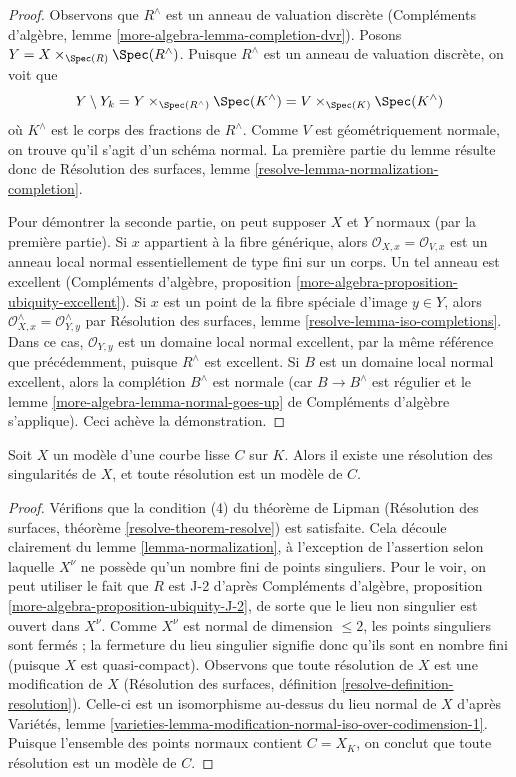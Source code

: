 \begin{proof}
Observons que $R^\wedge$ est un anneau de valuation discrète
(Compléments d'algèbre, lemme \ref{more-algebra-lemma-completion-dvr}).
Posons $Y = X \times_{\Spec(R)} \Spec(R^\wedge)$.
Puisque $R^\wedge$ est un anneau de valuation discrète, on voit que
$$
Y \setminus Y_k =
Y \times_{\Spec(R^\wedge)} \Spec(K^\wedge) =
V \times_{\Spec(K)} \Spec(K^\wedge)
$$
où $K^\wedge$ est le corps des fractions de $R^\wedge$.
Comme $V$ est géométriquement normale, on trouve qu'il s'agit
d'un schéma normal. La première partie du lemme résulte donc de
Résolution des surfaces, lemme \ref{resolve-lemma-normalization-completion}.

\medskip\noindent
Pour démontrer la seconde partie, on peut supposer $X$ et $Y$ normaux
(par la première partie). Si $x$ appartient à la fibre générique, alors
$\mathcal{O}_{X, x} = \mathcal{O}_{V, x}$ est un anneau local normal
essentiellement de type fini sur un corps. Un tel anneau est
excellent (Compléments d'algèbre, proposition
\ref{more-algebra-proposition-ubiquity-excellent}).
Si $x$ est un point de la fibre spéciale d'image $y \in Y$, alors
$\mathcal{O}_{X, x}^\wedge = \mathcal{O}_{Y, y}^\wedge$
par Résolution des surfaces, lemme \ref{resolve-lemma-iso-completions}.
Dans ce cas, $\mathcal{O}_{Y, y}$ est un domaine local normal excellent,
par la même référence que précédemment, puisque $R^\wedge$ est excellent.
Si $B$ est un domaine local normal excellent, alors la complétion
$B^\wedge$ est normale (car $B \to B^\wedge$ est régulier et le
lemme \ref{more-algebra-lemma-normal-goes-up} de Compléments d'algèbre s'applique).
Ceci achève la démonstration.
\end{proof}

\begin{lemma}
\label{lemma-regular}
Soit $X$ un modèle d'une courbe lisse $C$ sur $K$. Alors
il existe une résolution des singularités de $X$,
et toute résolution est un modèle de $C$.
\end{lemma}

\begin{proof}
Vérifions que la condition (4) du théorème de Lipman
(Résolution des surfaces, théorème \ref{resolve-theorem-resolve}) est satisfaite.
Cela découle clairement du lemme \ref{lemma-normalization},
à l'exception de l'assertion selon laquelle $X^\nu$ ne possède qu'un nombre fini de
points singuliers. Pour le voir, on peut utiliser le fait que $R$ est J-2 d'après
Compléments d'algèbre, proposition \ref{more-algebra-proposition-ubiquity-J-2},
de sorte que le lieu non singulier est ouvert dans $X^\nu$.
Comme $X^\nu$ est normal de dimension $\leq 2$, les points singuliers
sont fermés ; la fermeture du lieu singulier
signifie donc qu'ils sont en nombre fini (puisque $X$ est quasi-compact).
Observons que toute résolution de $X$ est une modification de $X$
(Résolution des surfaces, définition \ref{resolve-definition-resolution}).
Celle-ci est un isomorphisme au-dessus du lieu normal de $X$ d'après Variétés, lemme
\ref{varieties-lemma-modification-normal-iso-over-codimension-1}.
Puisque l'ensemble des points normaux contient
$C = X_K$, on conclut que toute résolution est un modèle de $C$.
\end{proof}

